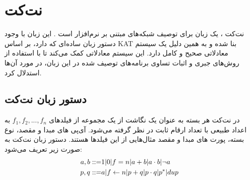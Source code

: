 \section{نت‌کت }
نت‌کت
، یک زبان برای توصیف شبکه‌های مبتنی بر نرم‌افزار است
\cite{netkat}.
این زبان با وجود دستور زبان
ساده‌ای که دارد، بر اساس
KAT
\cite{kat}
بنا شده و به همین دلیل یک سیستم معادلاتی صحیح و کامل
دارد.
این سیستم معادلاتی کمک می‌کند تا با استفاده از روش‌های جبری و اثبات تساوی برنامه‌های توصیف شده در این زبان، در مورد آن‌ها استدلال کرد.

\subsection{دستور زبان نت‌کت}
در نت‌کت هر بسته
 به عنوان یک نگاشت از یک مجموعه از فیلد‌های
$f_1,f_2,...,f_n$
به اعداد طبیعی با تعداد ارقام ثابت در نظر گرفته می‌شود.
آی‌پی‌
های مبدا و مقصد، نوع بسته، پورت‌
های مبدا و مقصد مثال‌هایی از این فیلد‌ها هستند.
دستور زبان نت‌کت به صورت زیر تعریف می‌شود:
\begin{align*}
    a,b ::= & 1 | 0 | f = n | a + b | a \cdot b | \neg a  \\
    p,q ::= & a | f \leftarrow n | p + q | p \cdot q | p^* | dup
\end{align*}
